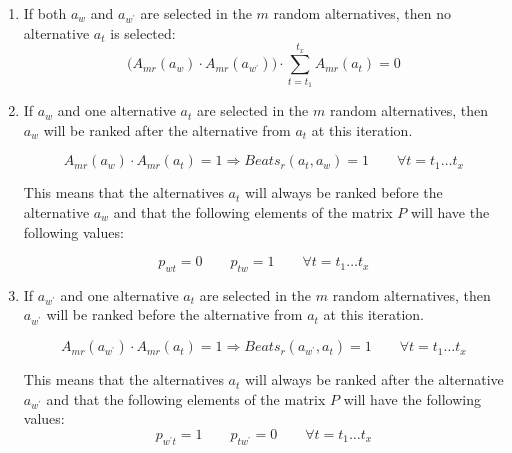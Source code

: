 \begin{enumerate}
    \item If both $a_w$ and $a_{w^{\prime}}$ are selected in the $m$ random alternatives, then no alternative $a_t$ is selected:
        \begin{equation}
            \big(A_{mr}(a_w) \cdot A_{mr}(a_{w^{\prime}})\big)\cdot \sum_{t=t_1}^{t_x}A_{mr}(a_t) = 0
        \end{equation}

    \item If $a_w$ and one alternative $a_t$ are selected in the $m$ random alternatives, then $a_w$ will be ranked after the alternative from $a_t$ at this iteration.

        \begin{equation}
            A_{mr}(a_w)\cdot A_{mr}(a_t) = 1
                \Rightarrow Beats_r(a_t, a_w) = 1 \qquad \forall t=t_1 \dots t_x
        \end{equation}

        This means that the alternatives $a_t$ will always be ranked before the alternative $a_w$ and that the following elements of the matrix $P$ will have the following values:  

        \begin{equation}
        p_{wt} = 0 \qquad p_{tw} = 1 \qquad  \forall t=t_1 \dots t_x
        \end{equation}

    \item If $a_{w^{\prime}}$ and one alternative $a_t$ are selected in the $m$ random alternatives, then $a_{w^{\prime}}$ will be ranked before the alternative from $a_t$ at this iteration.

        \begin{equation}
            A_{mr}(a_{w^{\prime}})\cdot A_{mr}(a_t) = 1
                \Rightarrow Beats_r(a_{w^{\prime}}, a_t) = 1 \qquad \forall t=t_1 \dots t_x
        \end{equation}

        This means that the alternatives $a_t$ will always be ranked after the alternative $a_{w^{\prime}}$ and that the following elements of the matrix $P$ will have the following values:  
        \begin{equation}
        p_{{w^{\prime}}t} = 1    \qquad  p_{t{w^{\prime}}} = 0   \qquad  \forall t=t_1 \dots t_x
        \end{equation}
\end{enumerate}

